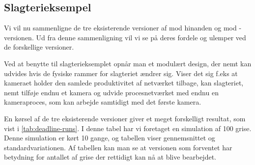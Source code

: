 % 
%  
%  

\subsection{Slagterieksempel}

Vi vil nu sammenligne de tre eksisterende versioner af \pycsp mod hinanden og mod -versionen. Ud fra denne sammenligning vil vi  se på deres fordele og ulemper ved de forskellige versioner.

Ved at benytte \pycsp til slagterieksemplet opnår man et modulært design, der nemt kan udvides hvis de fysiske rammer for slagteriet ændrer sig. Viser det sig f.eks at kameraet holder den samlede produktivitet af netværket tilbage, kan slagteriet, nemt tilføje endnu et kamera og udvide procesnetværket med endnu en kameraproces, som kan arbejde samtidigt med det første kamera. 

En kørsel af de tre eksisterende versioner giver et meget forskelligt resultat, som vist i \cref{tab:deadline-runs}. I denne tabel har vi foretaget en simulation af 100 grise. Denne simulation er kørt 10 gange, og tabellen viser gennemsnittet og standardvariationen. Af tabellen kan man se at versionen som forventet har betydning for antallet af grise der rettidigt kan nå at blive bearbejdet. 

